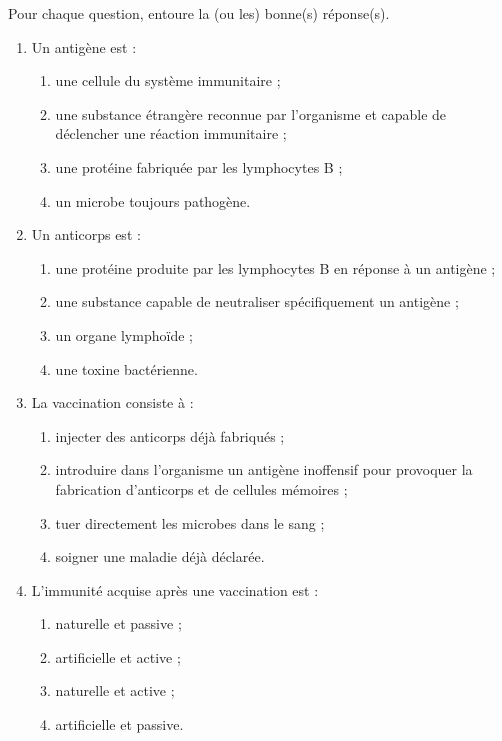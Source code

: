 \documentclass[11pt]{article}
\newcommand{\cle}[1]{{\popxbold\color{popdark}#1}}
\begin{document}
\begin{exercice}
Pour chaque question, entoure la (ou les) bonne(s) réponse(s).
\begin{enumerate}
\item Un \cle{antigène} est :
\begin{enumerate}
\item une cellule du système immunitaire ;
\item une substance étrangère reconnue par l'organisme et capable de déclencher une réaction immunitaire ;
\item une protéine fabriquée par les lymphocytes B ;
\item un microbe toujours pathogène.
\end{enumerate}
\item Un \cle{anticorps} est :
\begin{enumerate}
\item une protéine produite par les lymphocytes B en réponse à un antigène ;
\item une substance capable de neutraliser spécifiquement un antigène ;
\item un organe lymphoïde ;
\item une toxine bactérienne.
\end{enumerate}
\item La \cle{vaccination} consiste à :
\begin{enumerate}
\item injecter des anticorps déjà fabriqués ;
\item introduire dans l'organisme un antigène inoffensif pour provoquer la fabrication d'anticorps et de cellules mémoires ;
\item tuer directement les microbes dans le sang ;
\item soigner une maladie déjà déclarée.
\end{enumerate}
\item L'immunité acquise après une vaccination est :
\begin{enumerate}
\item naturelle et passive ;
\item artificielle et active ;
\item naturelle et active ;
\item artificielle et passive.
\end{enumerate}
\end{enumerate}
\end{exercice}
\end{document}
